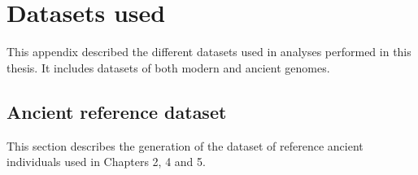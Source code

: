 
\appendix
\chapter{Datasets used}

This appendix described the different datasets used in analyses performed in this thesis. It includes datasets of both modern and ancient genomes.

\section{Ancient reference dataset} \label{section:AncientReferenceDataset}

This section describes the generation of the dataset of reference ancient individuals used in Chapters 2, 4 and 5. 

